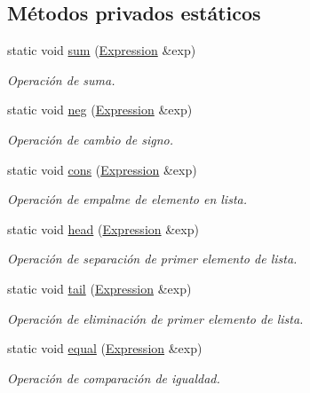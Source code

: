 \subsection*{Métodos privados estáticos}
\begin{DoxyCompactItemize}
\item 
static void \hyperlink{class_primitive_operation_space_aa30a58f2003a097535af96ea40b03429}{sum} (\hyperlink{class_expression}{Expression} \&exp)
\begin{DoxyCompactList}\small\item\em Operación de suma. \end{DoxyCompactList}\item 
static void \hyperlink{class_primitive_operation_space_a2ac4306bae8330f3eb73f5ef8926dfda}{neg} (\hyperlink{class_expression}{Expression} \&exp)
\begin{DoxyCompactList}\small\item\em Operación de cambio de signo. \end{DoxyCompactList}\item 
static void \hyperlink{class_primitive_operation_space_a4d80dbbbc29a79c286df7c8d7f351111}{cons} (\hyperlink{class_expression}{Expression} \&exp)
\begin{DoxyCompactList}\small\item\em Operación de empalme de elemento en lista. \end{DoxyCompactList}\item 
static void \hyperlink{class_primitive_operation_space_a97c2b5092e2465c7deb1aff6ceccc7de}{head} (\hyperlink{class_expression}{Expression} \&exp)
\begin{DoxyCompactList}\small\item\em Operación de separación de primer elemento de lista. \end{DoxyCompactList}\item 
static void \hyperlink{class_primitive_operation_space_a08ecc4d0207c93ab245f05732e0024c3}{tail} (\hyperlink{class_expression}{Expression} \&exp)
\begin{DoxyCompactList}\small\item\em Operación de eliminación de primer elemento de lista. \end{DoxyCompactList}\item 
static void \hyperlink{class_primitive_operation_space_a0a18ec45c82366aea7d1a39ec3b6bb57}{equal} (\hyperlink{class_expression}{Expression} \&exp)
\begin{DoxyCompactList}\small\item\em Operación de comparación de igualdad. \end{DoxyCompactList}\item 

\end{DoxyCompactItemize}
